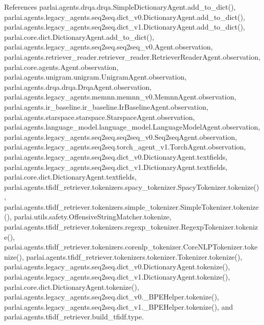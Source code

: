 References parlai.\+agents.\+drqa.\+drqa.\+Simple\+Dictionary\+Agent.\+add\+\_\+to\+\_\+dict(), parlai.\+agents.\+legacy\+\_\+agents.\+seq2seq.\+dict\+\_\+v0.\+Dictionary\+Agent.\+add\+\_\+to\+\_\+dict(), parlai.\+agents.\+legacy\+\_\+agents.\+seq2seq.\+dict\+\_\+v1.\+Dictionary\+Agent.\+add\+\_\+to\+\_\+dict(), parlai.\+core.\+dict.\+Dictionary\+Agent.\+add\+\_\+to\+\_\+dict(), parlai.\+agents.\+legacy\+\_\+agents.\+seq2seq.\+seq2seq\+\_\+v0.\+Agent.\+observation, parlai.\+agents.\+retriever\+\_\+reader.\+retriever\+\_\+reader.\+Retriever\+Reader\+Agent.\+observation, parlai.\+core.\+agents.\+Agent.\+observation, parlai.\+agents.\+unigram.\+unigram.\+Unigram\+Agent.\+observation, parlai.\+agents.\+drqa.\+drqa.\+Drqa\+Agent.\+observation, parlai.\+agents.\+legacy\+\_\+agents.\+memnn.\+memnn\+\_\+v0.\+Memnn\+Agent.\+observation, parlai.\+agents.\+ir\+\_\+baseline.\+ir\+\_\+baseline.\+Ir\+Baseline\+Agent.\+observation, parlai.\+agents.\+starspace.\+starspace.\+Starspace\+Agent.\+observation, parlai.\+agents.\+language\+\_\+model.\+language\+\_\+model.\+Language\+Model\+Agent.\+observation, parlai.\+agents.\+legacy\+\_\+agents.\+seq2seq.\+seq2seq\+\_\+v0.\+Seq2seq\+Agent.\+observation, parlai.\+agents.\+legacy\+\_\+agents.\+seq2seq.\+torch\+\_\+agent\+\_\+v1.\+Torch\+Agent.\+observation, parlai.\+agents.\+legacy\+\_\+agents.\+seq2seq.\+dict\+\_\+v0.\+Dictionary\+Agent.\+textfields, parlai.\+agents.\+legacy\+\_\+agents.\+seq2seq.\+dict\+\_\+v1.\+Dictionary\+Agent.\+textfields, parlai.\+core.\+dict.\+Dictionary\+Agent.\+textfields, parlai.\+agents.\+tfidf\+\_\+retriever.\+tokenizers.\+spacy\+\_\+tokenizer.\+Spacy\+Tokenizer.\+tokenize(), parlai.\+agents.\+tfidf\+\_\+retriever.\+tokenizers.\+simple\+\_\+tokenizer.\+Simple\+Tokenizer.\+tokenize(), parlai.\+utils.\+safety.\+Offensive\+String\+Matcher.\+tokenize, parlai.\+agents.\+tfidf\+\_\+retriever.\+tokenizers.\+regexp\+\_\+tokenizer.\+Regexp\+Tokenizer.\+tokenize(), parlai.\+agents.\+tfidf\+\_\+retriever.\+tokenizers.\+corenlp\+\_\+tokenizer.\+Core\+N\+L\+P\+Tokenizer.\+tokenize(), parlai.\+agents.\+tfidf\+\_\+retriever.\+tokenizers.\+tokenizer.\+Tokenizer.\+tokenize(), parlai.\+agents.\+legacy\+\_\+agents.\+seq2seq.\+dict\+\_\+v0.\+Dictionary\+Agent.\+tokenize(), parlai.\+agents.\+legacy\+\_\+agents.\+seq2seq.\+dict\+\_\+v1.\+Dictionary\+Agent.\+tokenize(), parlai.\+core.\+dict.\+Dictionary\+Agent.\+tokenize(), parlai.\+agents.\+legacy\+\_\+agents.\+seq2seq.\+dict\+\_\+v0.\+\_\+\+B\+P\+E\+Helper.\+tokenize(), parlai.\+agents.\+legacy\+\_\+agents.\+seq2seq.\+dict\+\_\+v1.\+\_\+\+B\+P\+E\+Helper.\+tokenize(), and parlai.\+agents.\+tfidf\+\_\+retriever.\+build\+\_\+tfidf.\+type.

